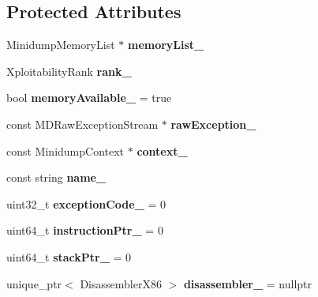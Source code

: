 \subsection*{Protected Attributes}
\begin{DoxyCompactItemize}
\item 
\mbox{\label{classsl2_1_1_xploitability_a65c489b85f26abce60b6d2786082b565}} 
Minidump\+Memory\+List $\ast$ {\bfseries memory\+List\+\_\+}
\item 
\mbox{\label{classsl2_1_1_xploitability_a2ab9bf2bb24ba0ee0d667c3ed03ca001}} 
Xploitability\+Rank {\bfseries rank\+\_\+}
\item 
\mbox{\label{classsl2_1_1_xploitability_a2cedc77c12512803a7a7ab932cc31ac0}} 
bool {\bfseries memory\+Available\+\_\+} = true
\item 
\mbox{\label{classsl2_1_1_xploitability_a35a332ae150a283c4d060b2e0a243a06}} 
const M\+D\+Raw\+Exception\+Stream $\ast$ {\bfseries raw\+Exception\+\_\+}
\item 
\mbox{\label{classsl2_1_1_xploitability_a94ad24c9dc35176907784f9629d2e7d0}} 
const Minidump\+Context $\ast$ {\bfseries context\+\_\+}
\item 
\mbox{\label{classsl2_1_1_xploitability_ac7ba7340fc7e5a19462e4c28970a2c61}} 
const string {\bfseries name\+\_\+}
\item 
\mbox{\label{classsl2_1_1_xploitability_a4495278e53793b22480cb110843dd39e}} 
uint32\+\_\+t {\bfseries exception\+Code\+\_\+} = 0
\item 
\mbox{\label{classsl2_1_1_xploitability_a09724d000ec48e11eb7fcf157c65bb8b}} 
uint64\+\_\+t {\bfseries instruction\+Ptr\+\_\+} = 0
\item 
\mbox{\label{classsl2_1_1_xploitability_ab9d46438b6931ae97e9cac1d4c88496b}} 
uint64\+\_\+t {\bfseries stack\+Ptr\+\_\+} = 0
\item 
\mbox{\label{classsl2_1_1_xploitability_a949526a9acb243250e658989d3139b23}} 
unique\+\_\+ptr$<$ Disassembler\+X86 $>$ {\bfseries disassembler\+\_\+} = nullptr
\end{DoxyCompactItemize}
